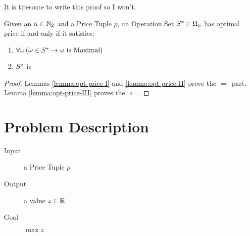 It is tiresome to write this proof so I won't.

\begin{theorem}
    Given an $n \in \mathbb{N}_{2}$ and a Price Tuple $p$, an Operation Set $S^{*} \in \Omega_{n}$ has optimal price if and only if it satisfies:
    \begin{enumerate}
        \item $\forall \omega \left(
            \omega \in S^{*} \rightarrow \omega \mbox{ is Maximal}
        \right)$
        \item $S^{*}$ is \great
    \end{enumerate}
\end{theorem}

\begin{proof}
    Lemmas \ref{lemma:opt-price-I} and \ref{lemma:opt-price-II} prove the $\Rightarrow$ part. Lemma \ref{lemma:opt-price-III} proves the $\Leftarrow$.
\end{proof}

\section{Problem Description}

\begin{description}
    \item[Input] a Price Tuple $p$
    \item[Output] a value $z \in \mathbb{R}$
    \item[Goal] $\max z$
\end{description}








